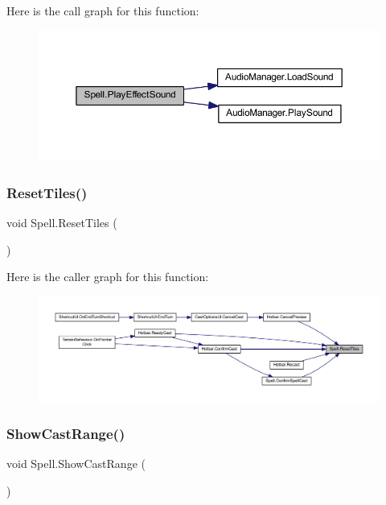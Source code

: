Here is the call graph for this function\+:\nopagebreak
\begin{figure}[H]
\begin{center}
\leavevmode
\includegraphics[width=350pt]{class_spell_a1dfbc90153df551bd995b8b852f808f0_cgraph}
\end{center}
\end{figure}
\mbox{\label{class_spell_a267e0b312732b826127c2d58ba64d90d}} 
\subsubsection{\texorpdfstring{ResetTiles()}{ResetTiles()}}
{\footnotesize\ttfamily void Spell.\+Reset\+Tiles (\begin{DoxyParamCaption}{ }\end{DoxyParamCaption})}

Here is the caller graph for this function\+:\nopagebreak
\begin{figure}[H]
\begin{center}
\leavevmode
\includegraphics[width=350pt]{class_spell_a267e0b312732b826127c2d58ba64d90d_icgraph}
\end{center}
\end{figure}
\mbox{\label{class_spell_ad49f8d3af9c5a885120ca85b510eae75}} 
\subsubsection{\texorpdfstring{ShowCastRange()}{ShowCastRange()}}
{\footnotesize\ttfamily void Spell.\+Show\+Cast\+Range (\begin{DoxyParamCaption}{ }\end{DoxyParamCaption})}

